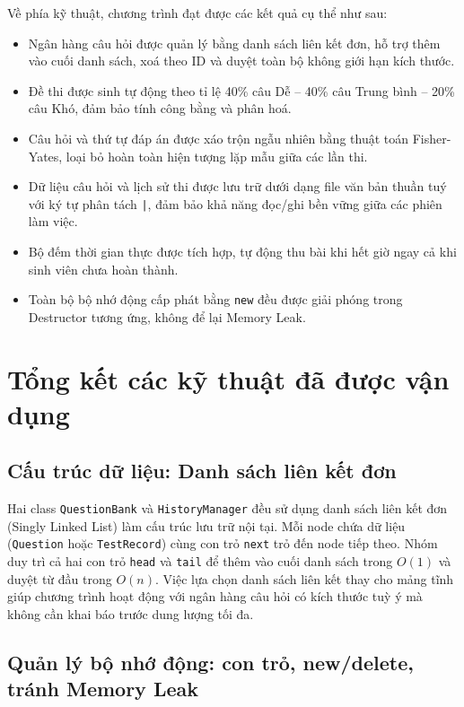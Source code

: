 \documentclass[11pt]{report}
\begin{document}
Về phía kỹ thuật, chương trình đạt được các kết quả cụ thể như sau:

\begin{itemize}[leftmargin=*]
    \item Ngân hàng câu hỏi được quản lý bằng danh sách liên kết đơn, hỗ trợ thêm vào cuối danh sách, xoá theo ID và duyệt toàn bộ không giới hạn kích thước.
    \item Đề thi được sinh tự động theo tỉ lệ 40\% câu Dễ -- 40\% câu Trung bình -- 20\% câu Khó, đảm bảo tính công bằng và phân hoá.
    \item Câu hỏi và thứ tự đáp án được xáo trộn ngẫu nhiên bằng thuật toán Fisher-Yates, loại bỏ hoàn toàn hiện tượng lặp mẫu giữa các lần thi.
    \item Dữ liệu câu hỏi và lịch sử thi được lưu trữ dưới dạng file văn bản thuần tuý với ký tự phân tách \texttt{|}, đảm bảo khả năng đọc/ghi bền vững giữa các phiên làm việc.
    \item Bộ đếm thời gian thực được tích hợp, tự động thu bài khi hết giờ ngay cả khi sinh viên chưa hoàn thành.
    \item Toàn bộ bộ nhớ động cấp phát bằng \texttt{new} đều được giải phóng trong Destructor tương ứng, không để lại Memory Leak.
\end{itemize}

\section{Tổng kết các kỹ thuật đã được vận dụng}

\subsection{Cấu trúc dữ liệu: Danh sách liên kết đơn}

Hai class \texttt{QuestionBank} và \texttt{HistoryManager} đều sử dụng danh sách liên kết đơn (Singly Linked List) làm cấu trúc lưu trữ nội tại. Mỗi node chứa dữ liệu (\texttt{Question} hoặc \texttt{TestRecord}) cùng con trỏ \texttt{next} trỏ đến node tiếp theo. Nhóm duy trì cả hai con trỏ \texttt{head} và \texttt{tail} để thêm vào cuối danh sách trong $O(1)$ và duyệt từ đầu trong $O(n)$. Việc lựa chọn danh sách liên kết thay cho mảng tĩnh giúp chương trình hoạt động với ngân hàng câu hỏi có kích thước tuỳ ý mà không cần khai báo trước dung lượng tối đa.

\subsection{Quản lý bộ nhớ động: con trỏ, new/delete, tránh Memory Leak}
\end{document}

